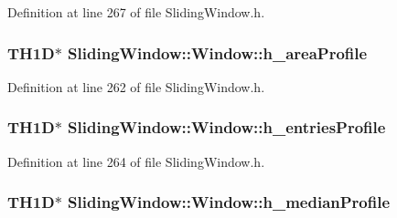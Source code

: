 Definition at line 267 of file Sliding\+Window.\+h.

\subsubsection[{\texorpdfstring{h\+\_\+area\+Profile}{h_areaProfile}}]{\setlength{\rightskip}{0pt plus 5cm}T\+H1D$\ast$ Sliding\+Window\+::\+Window\+::h\+\_\+area\+Profile\hspace{0.3cm}{\ttfamily [protected]}}\hypertarget{classSlidingWindow_1_1Window_a64de3976873889730213091ea196eee9}{}\label{classSlidingWindow_1_1Window_a64de3976873889730213091ea196eee9}


Definition at line 262 of file Sliding\+Window.\+h.

\subsubsection[{\texorpdfstring{h\+\_\+entries\+Profile}{h_entriesProfile}}]{\setlength{\rightskip}{0pt plus 5cm}T\+H1D$\ast$ Sliding\+Window\+::\+Window\+::h\+\_\+entries\+Profile\hspace{0.3cm}{\ttfamily [protected]}}\hypertarget{classSlidingWindow_1_1Window_af23a441ea30a49948e3d3a77ac921127}{}\label{classSlidingWindow_1_1Window_af23a441ea30a49948e3d3a77ac921127}


Definition at line 264 of file Sliding\+Window.\+h.

\subsubsection[{\texorpdfstring{h\+\_\+median\+Profile}{h_medianProfile}}]{\setlength{\rightskip}{0pt plus 5cm}T\+H1D$\ast$ Sliding\+Window\+::\+Window\+::h\+\_\+median\+Profile\hspace{0.3cm}{\ttfamily [protected]}}\hypertarget{classSlidingWindow_1_1Window_abe926d32bb55044c3ab6ae69d6ed7503}{}\label{classSlidingWindow_1_1Window_abe926d32bb55044c3ab6ae69d6ed7503}


